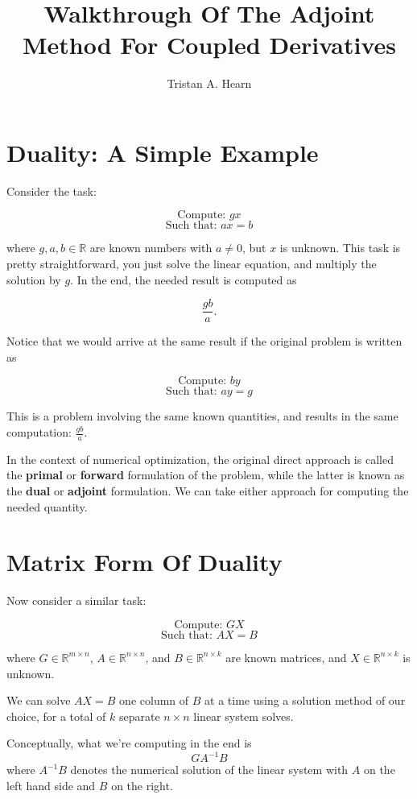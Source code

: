 \documentclass{article}
\title{Walkthrough Of The Adjoint Method For Coupled Derivatives}
\author{Tristan A. Hearn}
\begin{document}
\maketitle

\section{Duality: A Simple Example}

Consider the task:

$$\text{Compute: } g x$$
$$\text{Such that: } a x = b$$

where $g, a, b \in \mathbb{R}$ are known numbers with $a \ne 0$, but $x$ is unknown. This task is pretty straightforward,
you just solve the linear equation, and multiply the solution by $g$. In the end, the 
needed result is computed as

$$\frac{gb}{a}.$$

Notice that we would arrive at the same result if the original problem is written as

$$\text{Compute: } b y$$
$$\text{Such that: } a y = g$$

This is a problem involving the same known quantities, and results in the
 same computation: $\frac{gb}{a}$. 

In the context of numerical optimization, the original direct approach is called 
the \textbf{primal} or \textbf{forward} formulation of the problem, while the latter is known as the 
\textbf{dual} or \textbf{adjoint} formulation.
We can take either approach for computing the needed quantity.

\section{Matrix Form Of Duality}

Now consider a similar task:

$$\text{Compute: } G X$$
$$\text{Such that: } A X = B$$

where $G \in \mathbb{R}^{m \times n}$, $A \in \mathbb{R}^{n \times n}$, and
$B \in \mathbb{R}^{n \times k}$ are known matrices, and 
$X \in \mathbb{R}^{n \times k}$ is unknown. 

We can solve $A X = B$ one column of $B$ at a time using a solution method of our
choice, for a total of $k$ separate $n \times n$ linear system solves.

Conceptually, what we're computing in the end is
$$ G A^{-1} B$$
where $A^{-1} B$ denotes the numerical solution of the linear system with $A$ on 
the left hand side and $B$ on the right.
\end{document}
